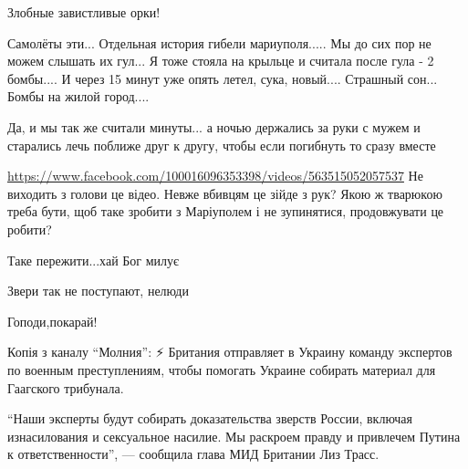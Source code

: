  
 
 
 
 

\qqSecCmt


Злобные завистливые орки!


Самолёты эти... Отдельная история гибели мариуполя..... Мы до сих пор не можем
слышать их гул... Я тоже стояла на крыльце и считала после гула - 2 бомбы.... И
через 15 минут уже опять летел, сука, новый.... Страшный сон... Бомбы на жилой
город....


Да, и мы так же считали минуты... а ночью держались за руки с мужем и старались
лечь поближе друг к другу, чтобы если погибнуть то сразу вместе


\url{https://www.facebook.com/100016096353398/videos/563515052057537} Не виходить з
голови це відео. Невже вбивцям це зійде з рук? Якою ж тварюкою треба бути, щоб
таке зробити з Маріуполем і не зупинятися, продовжувати це робити?


Таке пережити...хай Бог милує


Звери так не поступают, нелюди


Гоподи,покарай!


Копія з каналу \enquote{Молния}: ⚡️ Британия отправляет в Украину команду экспертов по
военным преступлениям, чтобы помогать Украине собирать материал для Гаагского
трибунала.

\enquote{Наши эксперты будут собирать доказательства зверств России, включая
изнасилования и сексуальное насилие. Мы раскроем правду и привлечем Путина к
ответственности}, — сообщила глава МИД Британии Лиз Трасс.

